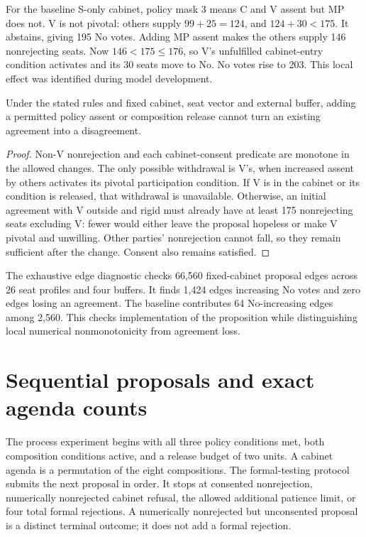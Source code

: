 For the baseline S-only cabinet, policy mask 3 means C and V assent but MP does not. V is not pivotal: others supply \(99+25=124\), and \(124+30<175\). It abstains, giving 195 No votes. Adding MP assent makes the others supply 146 nonrejecting seats. Now \(146<175\le176\), so V's unfulfilled cabinet-entry condition activates and its 30 seats move to No. No votes rise to 203. This local effect was identified during model development.

\begin{proposition}\label{prop:monotone}
Under the stated rules and fixed cabinet, seat vector and external buffer, adding a permitted policy assent or composition release cannot turn an existing agreement into a disagreement.
\end{proposition}
\begin{proof}
Non-V nonrejection and each cabinet-consent predicate are monotone in the allowed changes. The only possible withdrawal is V's, when increased assent by others activates its pivotal participation condition. If V is in the cabinet or its condition is released, that withdrawal is unavailable. Otherwise, an initial agreement with V outside and rigid must already have at least 175 nonrejecting seats excluding V: fewer would either leave the proposal hopeless or make V pivotal and unwilling. Other parties' nonrejection cannot fall, so they remain sufficient after the change. Consent also remains satisfied.
\end{proof}

The exhaustive edge diagnostic checks 66,560 fixed-cabinet proposal edges across 26 seat profiles and four buffers. It finds 1,424 edges increasing No votes and zero edges losing an agreement. The baseline contributes 64 No-increasing edges among 2,560. This checks implementation of the proposition while distinguishing local numerical nonmonotonicity from agreement loss.

\section{Sequential proposals and exact agenda counts}

The process experiment begins with all three policy conditions met, both composition conditions active, and a release budget of two units. A cabinet agenda is a permutation of the eight compositions. The formal-testing protocol submits the next proposal in order. It stops at consented nonrejection, numerically nonrejected cabinet refusal, the allowed additional patience limit, or four total formal rejections. A numerically nonrejected but unconsented proposal is a distinct terminal outcome; it does not add a formal rejection.

